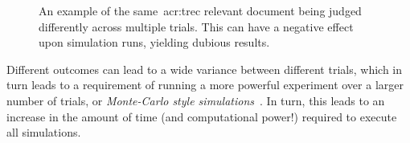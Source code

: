 \begin{figure}[t!]
    \centering
    \vspace{4mm}
    \caption[Stochastic judging across multiple trials]{An example of the same~\gls{acr:trec} relevant document being judged differently across multiple trials. This can have a negative effect upon simulation runs, yielding dubious results.}
    \label{fig:multiple_runs}
\end{figure}

Different outcomes can lead to a wide variance between different trials, which in turn leads to a requirement of running a more powerful experiment over a larger number of trials, or \emph{Monte-Carlo style simulations}~\citep{benov2016manhattan}. In turn, this leads to an increase in the amount of time (and computational power!) required to execute all simulations.


